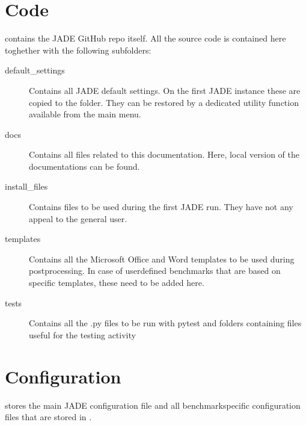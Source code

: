 \documentclass[letterpaper,10pt,english]{sphinxmanual}
\begin{document}
\section{Code}
\label{\detokenize{usage/folders:code}}
\sphinxAtStartPar
{} contains the JADE GitHub repo itself. All the source code is contained here toghether with the
following subfolders:
\begin{description}
\item[{default\_settings}] \leavevmode
\sphinxAtStartPar
Contains all JADE default settings. On the first JADE instance these are copied to the 
folder. They can be restored by a dedicated utility function available from the main menu.

\item[{docs}] \leavevmode
\sphinxAtStartPar
Contains all files related to this documentation. Here, local version of the documentations can be found.

\item[{install\_files}] \leavevmode
\sphinxAtStartPar
Contains files to be used during the first JADE run. They have not any appeal to the general user.

\item[{templates}] \leavevmode
\sphinxAtStartPar
Contains all the Microsoft Office and Word templates to be used during post\sphinxhyphen{}processing. In case of user\sphinxhyphen{}defined
benchmarks that are based on specific templates, these need to be added here.

\item[{tests}] \leavevmode
\sphinxAtStartPar
Contains all the .py files to be run with pytest and folders containing files useful for the testing activity

\end{description}


\section{Configuration}
\label{\detokenize{usage/folders:configuration}}
\sphinxAtStartPar
{} stores the main JADE configuration file  and all benchmark\sphinxhyphen{}specific configuration
files that are stored in .
\end{document}
